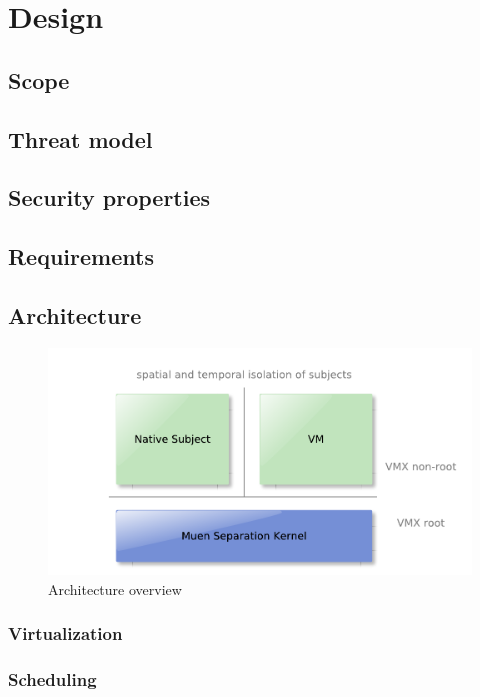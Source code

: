 \chapter{Design}
\section{Scope}
\section{Threat model}
\section{Security properties}
\section{Requirements}
\section{Architecture}
\begin{figure}[h]
	\centering
	\includegraphics[scale=0.7]{images/architecture-overview}
	\caption{Architecture overview}
	\label{fig:architecture-overview}
\end{figure}

\subsection{Virtualization}
\subsection{Scheduling}
